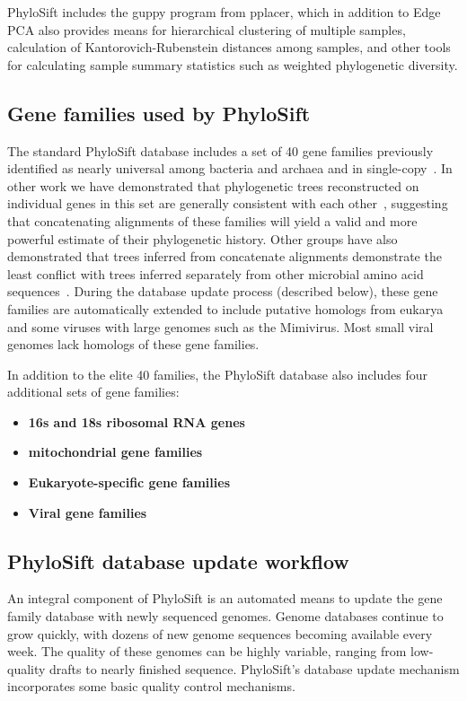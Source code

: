 \documentclass[10pt]{article}
\begin{document}
PhyloSift includes the guppy program from pplacer, which in addition to Edge PCA also provides means for hierarchical clustering of multiple samples, calculation of Kantorovich-Rubenstein distances among samples, and other tools for calculating sample summary statistics such as weighted phylogenetic diversity.

\subsection*{Gene families used by PhyloSift}

The standard PhyloSift database includes a set of 40 gene families previously identified as nearly universal among bacteria and archaea and in single-copy~\cite{DongyingWu2012}.
In other work we have demonstrated that phylogenetic trees reconstructed on individual genes in this set are generally consistent with each other~\cite{Lang2012}, suggesting that concatenating alignments of these families will yield a valid and more powerful estimate of their phylogenetic history.
Other groups have also demonstrated that trees inferred from concatenate alignments demonstrate the least conflict with trees inferred separately from other microbial amino acid sequences~\cite{Abby2012}. 
During the database update process (described below), these gene families are automatically extended to include putative homologs from eukarya and some viruses with large genomes such as the Mimivirus.
Most small viral genomes lack homologs of these gene families.

In addition to the elite 40 families, the PhyloSift database also includes four additional sets of gene families:
\begin{itemize}
\item \textbf{16s and 18s ribosomal {RNA} genes}
\item \textbf{mitochondrial gene families}
\item \textbf{Eukaryote-specific gene families}
\item \textbf{Viral gene families}
\end{itemize}

\subsection*{PhyloSift database update workflow}\label{sec:dbupdate}
An integral component of PhyloSift is an automated means to update the gene family database with newly sequenced genomes.
Genome databases continue to grow quickly, with dozens of new genome sequences becoming available every week.
The quality of these genomes can be highly variable, ranging from low-quality drafts to nearly finished sequence.
PhyloSift's database update mechanism incorporates some basic quality control mechanisms.
\end{document}
